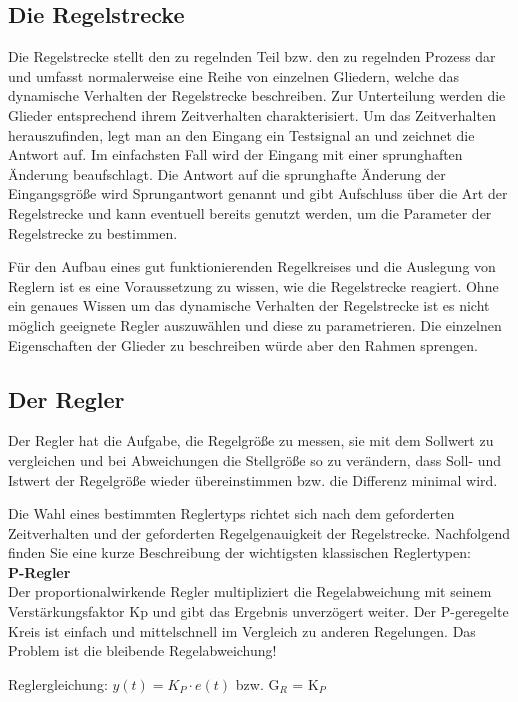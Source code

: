 \newpage

\subsection{Die Regelstrecke}
Die Regelstrecke stellt den zu regelnden Teil bzw. den zu regelnden Prozess dar und umfasst normalerweise eine Reihe von einzelnen Gliedern, welche das dynamische Verhalten der Regelstrecke beschreiben. Zur Unterteilung werden die Glieder entsprechend ihrem Zeitverhalten charakterisiert. Um das Zeitverhalten herauszufinden, legt man an den Eingang ein Testsignal an und zeichnet die Antwort auf. Im einfachsten Fall wird der Eingang mit einer sprunghaften Änderung beaufschlagt. Die Antwort auf die sprunghafte Änderung der Eingangsgröße wird Sprungantwort genannt und gibt Aufschluss über die Art der Regelstrecke und kann eventuell bereits genutzt werden, um die Parameter der Regelstrecke zu bestimmen.

Für den Aufbau eines gut funktionierenden Regelkreises und die Auslegung von Reglern ist es eine Voraussetzung zu wissen, wie die Regelstrecke reagiert. Ohne ein genaues Wissen um das dynamische Verhalten der Regelstrecke ist es nicht möglich geeignete Regler auszuwählen und diese zu parametrieren. Die einzelnen Eigenschaften der Glieder zu beschreiben würde aber den Rahmen sprengen.

\subsection{Der Regler}
Der Regler hat die Aufgabe, die Regelgröße zu messen, sie mit dem Sollwert zu vergleichen und bei Abweichungen die Stellgröße so zu verändern, dass Soll- und Istwert der Regelgröße wieder übereinstimmen bzw. die Differenz minimal wird.

Die Wahl eines bestimmten Reglertyps richtet sich nach dem geforderten Zeitverhalten und der geforderten Regelgenauigkeit der Regelstrecke. Nachfolgend finden Sie eine kurze Beschreibung der wichtigsten klassischen Reglertypen: 
\\[5mm]
\textbf{P-Regler}\\[1mm]
Der proportionalwirkende Regler multipliziert die Regelabweichung mit seinem Verstärkungsfaktor Kp und gibt das Ergebnis unverzögert weiter. Der P-geregelte Kreis ist einfach und mittelschnell im Vergleich zu anderen Regelungen. Das Problem ist die bleibende Regelabweichung!

Reglergleichung: \hspace{5mm} $y(t) = K_P \cdot e(t)$ \hspace{5mm} bzw. \hspace{5mm} G$_R$ = K$_P$
\\[5mm]


